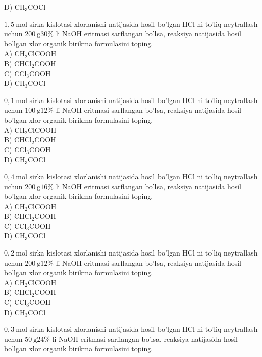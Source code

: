 D) $\mathrm{CH}_{3} \mathrm{COCl}$
  \item $1,5 \mathrm{~mol}$ sirka kislotasi xlorlanishi natijasida hosil bo'lgan HCl ni to'liq neytrallash uchun $200 \mathrm{~g} 30 \%$ li NaOH eritmasi sarflangan bo'lsa, reaksiya natijasida hosil bo'lgan xlor organik birikma formulasini toping.\\
A) $\mathrm{CH}_{2} \mathrm{ClCOOH}$\\
B) $\mathrm{CHCl}_{2} \mathrm{COOH}$\\
C) $\mathrm{CCl}_{3} \mathrm{COOH}$\\
D) $\mathrm{CH}_{3} \mathrm{COCl}$
  \item $0,1 \mathrm{~mol}$ sirka kislotasi xlorlanishi natijasida hosil bo'lgan HCl ni to'liq neytrallash uchun $100 \mathrm{~g} 12 \%$ li NaOH eritmasi sarflangan bo'lsa, reaksiya natijasida hosil bo'lgan xlor organik birikma formulasini toping.\\
A) $\mathrm{CH}_{2} \mathrm{ClCOOH}$\\
B) $\mathrm{CHCl}_{2} \mathrm{COOH}$\\
C) $\mathrm{CCl}_{3} \mathrm{COOH}$\\
D) $\mathrm{CH}_{3} \mathrm{COCl}$
  \item $0,4 \mathrm{~mol}$ sirka kislotasi xlorlanishi natijasida hosil bo'lgan HCl ni to'liq neytrallash uchun $200 \mathrm{~g} 16 \%$ li NaOH eritmasi sarflangan bo'lsa, reaksiya natijasida hosil bo'lgan xlor organik birikma formulasini toping.\\
A) $\mathrm{CH}_{2} \mathrm{ClCOOH}$\\
B) $\mathrm{CHCl}_{2} \mathrm{COOH}$\\
C) $\mathrm{CCl}_{3} \mathrm{COOH}$\\
D) $\mathrm{CH}_{3} \mathrm{COCl}$
  \item $0,2 \mathrm{~mol}$ sirka kislotasi xlorlanishi natijasida hosil bo'lgan HCl ni to'liq neytrallash uchun $200 \mathrm{~g} 12 \%$ li NaOH eritmasi sarflangan bo'lsa, reaksiya natijasida hosil bo'lgan xlor organik birikma formulasini toping.\\
A) $\mathrm{CH}_{2} \mathrm{ClCOOH}$\\
B) $\mathrm{CHCl}_{2} \mathrm{COOH}$\\
C) $\mathrm{CCl}_{3} \mathrm{COOH}$\\
D) $\mathrm{CH}_{3} \mathrm{COCl}$
  \item $0,3 \mathrm{~mol}$ sirka kislotasi xlorlanishi natijasida hosil bo'lgan HCl ni to'liq neytrallash uchun $50 \mathrm{~g} 24 \%$ li NaOH eritmasi sarflangan bo'lsa, reaksiya natijasida hosil bo'lgan xlor organik birikma formulasini toping.\\
